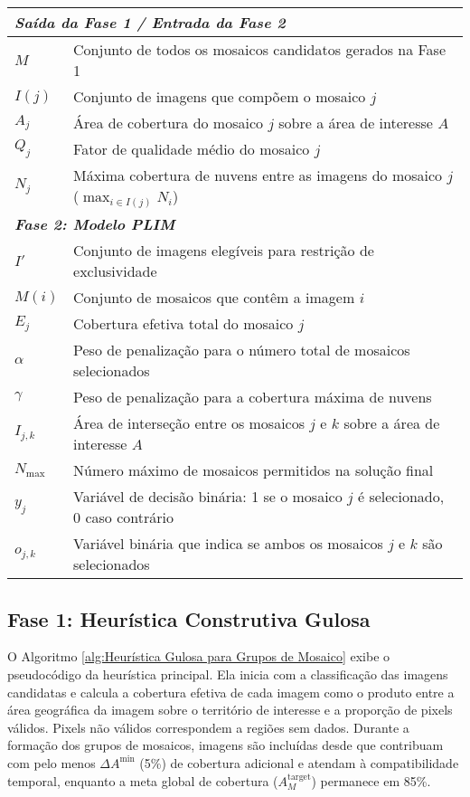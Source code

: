 \documentclass[a4paper,11pt]{article}
\begin{document}
\begin{table}[ht!]
\begin{tabular}{p{2.5cm}p{11.5cm}}
        \midrule
        \multicolumn{2}{l}{\footnotesize\textit{\textbf{Saída da Fase 1 / Entrada da Fase 2}}} \\
        \midrule
        $M$        & Conjunto de todos os mosaicos candidatos gerados na Fase 1 \\
        $I(j)$     & Conjunto de imagens que compõem o mosaico $j$ \\
        $A_j$      & Área de cobertura do mosaico $j$ sobre a área de interesse $A$ \\
        $Q_j$      & Fator de qualidade médio do mosaico $j$ \\
        $N_j$      & Máxima cobertura de nuvens entre as imagens do mosaico $j$ ($\max_{i \in I(j)} N_i$) \\[1pt]
        \midrule
        \multicolumn{2}{l}{\footnotesize\textit{\textbf{Fase 2: Modelo PLIM}}} \\
        \midrule
        $I'$       & Conjunto de imagens elegíveis para restrição de exclusividade \\
        $M(i)$     & Conjunto de mosaicos que contêm a imagem $i$ \\
        $E_j$      & Cobertura efetiva total do mosaico $j$ \\
        $\alpha$   & Peso de penalização para o número total de mosaicos selecionados \\
        $\gamma$   & Peso de penalização para a cobertura máxima de nuvens \\
        $I_{j,k}$  & Área de interseção entre os mosaicos $j$ e $k$ sobre a área de interesse $A$ \\
        $N_{\max}$ & Número máximo de mosaicos permitidos na solução final \\
        $y_j$      & Variável de decisão binária: 1 se o mosaico $j$ é selecionado, 0 caso contrário \\
        $o_{j,k}$  & Variável binária que indica se ambos os mosaicos $j$ e $k$ são selecionados \\
        \bottomrule
    \end{tabular}
\end{table}

\vspace{-6mm}
\subsection{Fase 1: Heurística Construtiva Gulosa} \label{sec:fase1}
\vspace{-3mm}
O Algoritmo \ref{alg:Heurística Gulosa para Grupos de Mosaico} exibe o pseudocódigo da heurística principal. Ela inicia com a classificação das imagens candidatas e calcula a cobertura efetiva de cada imagem como o produto entre a área geográfica da imagem sobre o território de interesse e a proporção de pixels válidos. Pixels não válidos correspondem a regiões sem dados. Durante a formação dos grupos de mosaicos, imagens são incluídas desde que contribuam com pelo menos $\Delta A^{\min}$ (5\%) de cobertura adicional e atendam à compatibilidade temporal, enquanto a meta global de cobertura ($A_M^{\text{target}}$) permanece em 85\%.
\end{document}
